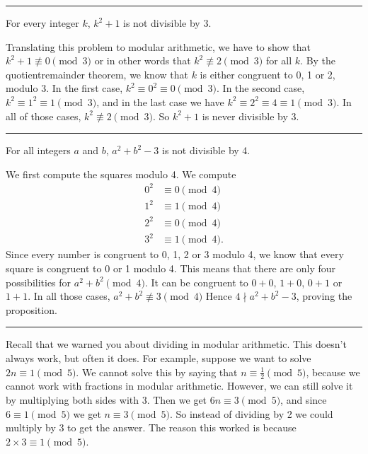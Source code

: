 \documentclass[letterpaper,10pt,english]{sphinxmanual}
\begin{document}
\bigskip\hrule\bigskip


\sphinxAtStartPar
{} For every integer \(k\), \(k^2+1\) is not divisible by 3.

\sphinxAtStartPar
{} Translating this problem to modular arithmetic, we have to show that \(k^2+1 \not\equiv 0 \pmod{3}\) or in other words that \(k^2\not\equiv 2 \pmod{3}\) for all \(k\). By the quotient\sphinxhyphen{}remainder theorem, we know that \(k\) is either congruent to 0, 1 or 2, modulo 3. In the first case, \(k^2\equiv 0^2\equiv 0\pmod{3}\). In the second case, \(k^{2}\equiv 1^2 \equiv 1 \pmod{3}\), and in the last case we have \(k^{2}\equiv2^2\equiv4\equiv1\pmod{3}\). In all of those cases, \(k^2\not\equiv2\pmod{3}\). So \(k^2+1\) is never divisible by 3.


\bigskip\hrule\bigskip


\sphinxAtStartPar
{} For all integers \(a\) and \(b\), \(a^2+b^2-3\) is not divisible by 4.

\sphinxAtStartPar
{} We first compute the squares modulo 4. We compute
\begin{equation*}
\begin{split}0^2&\equiv 0\pmod{4}\\
1^2&\equiv 1\pmod{4}\\
2^2&\equiv 0\pmod{4}\\
3^2&\equiv 1\pmod{4}.\end{split}
\end{equation*}
\sphinxAtStartPar
Since every number is congruent to 0, 1, 2 or 3 modulo 4, we know that every square is congruent to 0 or 1 modulo 4. This means that there are only four possibilities for \(a^2+b^2\pmod{4}\). It can be congruent to \(0+0\), \(1+0\), \(0+1\) or \(1+1\). In all those cases, \(a^2+b^2\not\equiv 3\pmod{4}\) Hence \(4\nmid a^2+b^2-3\), proving the proposition.


\bigskip\hrule\bigskip


\sphinxAtStartPar
Recall that we warned you about dividing in modular arithmetic. This doesn’t always work, but often it does. For example, suppose we want to solve \(2n \equiv 1 \pmod{5}\). We cannot solve this by saying that \(n \equiv \frac12 \pmod{5}\), because we cannot work with fractions in modular arithmetic. However, we can still solve it by multiplying both sides with 3. Then we get \(6n \equiv 3 \pmod{5}\), and since \(6\equiv 1 \pmod{5}\) we get \(n \equiv 3 \pmod{5}\). So instead of dividing by 2 we could multiply by 3 to get the answer. The reason this worked is because \(2\times 3\equiv 1\pmod{5}\).
\end{document}
